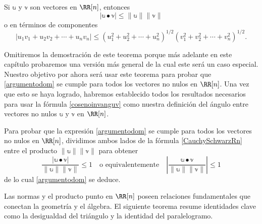 \begin{theorem}{}{}
     Si $\mathbb{u}$ y $\mathbb{v}$ son vectores en $\RR[n]$, entonces
    \begin{equation}
        |\mathbb{u} \bullet \mathbb{v}| \leq \|\mathbb{u}\| \|\mathbb{v}\| \label{CauchySchwarzRn}
    \end{equation}
    o en términos de componentes
    $$|u_1 v_1 + u_2 v_2 + \cdots + u_n v_n| \leq \left(u_1^2 + u_2^2 + \cdots + u_n^2\right)^{1/2} \left(v_1^2 + v_2^2 + \cdots + v_n^2\right)^{1/2}.$$
\end{theorem}

Omitiremos la demostración de este teorema porque más adelante en este capítulo probaremos una versión más general de la cual este será un caso especial. Nuestro objetivo por ahora será usar este teorema para probar que \eqref{argumentodom} se cumple para todos los vectores no nulos en $\RR[n]$. Una vez que esto se haya logrado, habremos establecido todos los resultados necesarios para usar la fórmula \eqref{cosenoinvanguv} como nuestra definición del ángulo entre vectores no nulos $\mathbb{u}$ y $\mathbb{v}$ en $\RR[n]$.

Para probar que la expresión \eqref{argumentodom} se cumple para todos los vectores no nulos en $\RR[n]$, dividimos ambos lados de la fórmula \eqref{CauchySchwarzRn} entre el producto $\|\mathbb{u}\| \|\mathbb{v}\|$ para obtener
$$\frac{|\mathbb{u} \bullet \mathbb{v}|}{\|\mathbb{u}\| \|\mathbb{v}\|} \leq 1 \quad \text{o equivalentemente} \quad \left|\frac{\mathbb{u} \bullet \mathbb{v}}{\|\mathbb{u}\| \|\mathbb{v}\|}\right| \leq 1$$
de lo cual \eqref{argumentodom} se deduce.

Las normas y el producto punto en $\RR[n]$ poseen relaciones fundamentales que conectan la geometría y el álgebra. El siguiente teorema resume identidades clave como la desigualdad del triángulo y la identidad del paralelogramo.


